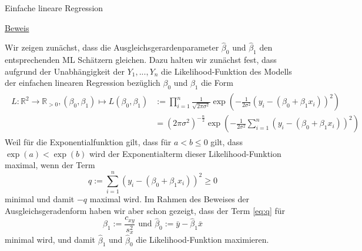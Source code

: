\documentclass[
  8pt,
  ignorenonframetext,
]{beamer}
\begin{document}
\begin{frame}{Einfache lineare Regression}
\protect\hypertarget{einfache-lineare-regression-7}{}
\tiny
\setlength{\abovedisplayskip}{1pt}
\setlength{\belowdisplayskip}{1pt}

\underline{Beweis}

Wir zeigen zunächst, dass die Ausgleichsgerardenparameter
\(\hat{\beta}_0\) und \(\hat{\beta}_1\) den entsprechenden ML Schätzern
gleichen. Dazu halten wir zunächst fest, dass aufgrund der
Unabhängigkeit der \(Y_1, ...,Y_n\) die Likelihood-Funktion des Modells
der einfachen linearen Regression bezüglich \(\beta_0\) und \(\beta_1\)
die Form \begin{align}
\begin{split}
L : \mathbb{R}^2 \to \mathbb{R}_{>0}, (\beta_0,\beta_1) \mapsto L(\beta_0,\beta_1)
& := \prod_{i=1}^n \frac{1}{\sqrt{2\pi\sigma^2}}\exp\left(-\frac{1}{2\sigma^2}(y_i - (\beta_0 + \beta_1x_i))^2\right) \\
&  = \left(2\pi\sigma^2\right)^{-\frac{n}{2}}\exp\left(-\frac{1}{2\sigma^2}\sum_{i=1}^n(y_i - (\beta_0 + \beta_1x_i))^2\right)
\end{split}
\end{align} Weil für die Exponentialfunktion gilt, dass für
\(a < b \le 0\) gilt, dass \(\exp(a)<\exp(b)\) wird der Exponentialterm
dieser Likelihood-Funktion maximal, wenn der Term
\begin{equation}\label{eq:q}
q := \sum_{i=1}^n(y_i - (\beta_0 + \beta_1x_i))^2 \ge 0
\end{equation} minimal und damit \(-q\) maximal wird. Im Rahmen des
Beweises der Ausgleichsgeradenform haben wir aber schon gezeigt, dass
der Term \eqref{eq:q} für \begin{equation}
\hat{\beta}_1   := \frac{c_{xy}}{s_x^2} \mbox{ und } \hat{\beta}_0   := \bar{y} - \hat{\beta}_1\bar{x}
\end{equation} minimal wird, und damit \(\hat{\beta}_1\) und
\(\hat{\beta}_0\) die Likelihood-Funktion maximieren.
\end{frame}
\end{document}
